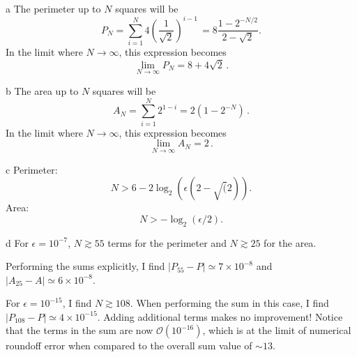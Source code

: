 \documentclass[]{homework}
\begin{document}



\begin{problem}{1} 
  \,
  \begin{subproblem}{a}
    The perimeter up to $N$ squares will be
    \begin{equation}
      P_N = \sum_{i=1}^N  4 \left( \frac{1}{\sqrt{2}} \right)^{i-1}\, = 8 \frac{1-2^{-N/2}}{2-\sqrt{2}} .
    \end{equation}
    In the limit where $N \rightarrow \infty$, this expression becomes
    \begin{equation}
      \lim_{N\rightarrow \infty} P_N = 8 + 4 \sqrt{2} \,.
    \end{equation}
  \end{subproblem}


  \begin{subproblem}{b}
    The area up to $N$ squares will be
    \begin{equation}
      A_N = \sum_{i=1}^N 2^{1-i} = 2\left(1-2^{-N}\right)\,.
    \end{equation}
    In the limit where $N \rightarrow \infty$, this expression becomes
    \begin{equation}
      \lim_{N\rightarrow \infty} A_N = 2 \,.
    \end{equation}
  \end{subproblem}


  \begin{subproblem}{c}
    Perimeter:
    \begin{equation}
      N > 6 - 2 \log_2 \left( \epsilon (2 - \sqrt(2) \right) .
    \end{equation}
    Area:
    \begin{equation}
      N > - \log_2 ( \epsilon/2 ) .
    \end{equation}
  \end{subproblem}

  \begin{subproblem}{d}
    For $\epsilon=10^{-7}$, $N \gtrsim 55$ terms for the perimeter and $N \gtrsim 25$ for the area.

    Performing the sums explicitly, I find
    $\left|P_{55} - P\right| \simeq 7\times10^{-8}$ and $\left|A_{25} - A\right| \simeq 6\times10^{-8}$.

    For $\epsilon=10^{-15}$, I find $N \gtrsim 108$. When performing the sum in this case, I find
    $\left|P_{108} - P\right| \simeq 4\times10^{-15}$. Adding additional terms makes no improvement!
    Notice that the terms in the sum are now $\mathcal{O}(10^{-16})$, which is at the limit of numerical
    roundoff error when compared to the overall sum value of $\sim 13$.
  \end{subproblem}
\end{problem}
\end{document}
